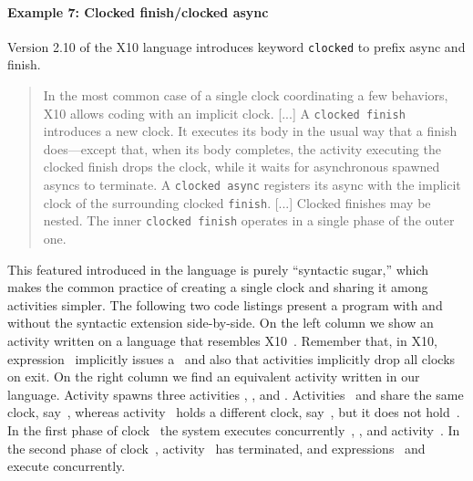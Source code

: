 \paragraph{Example 7: Clocked finish/clocked async}

Version 2.10 of the X10 language introduces keyword \lstinline{clocked} to
prefix async and finish.
\begin{quote}
  In the most common case of a single clock coordinating a few
  behaviors, X10 allows coding with an implicit clock.
[...]
A \lstinline{clocked finish} introduces a new clock.
It executes its body in the usual way that a finish does---except
  that, when its body completes, the activity executing the clocked
  finish drops the clock, while it waits for asynchronous spawned
  asyncs to terminate.
A \lstinline{clocked async} registers its async with the implicit clock
  of the surrounding clocked \lstinline{finish}.
[...]
Clocked finishes may be nested. The inner
  \lstinline{clocked finish} operates in a single phase of the outer one.
\end{quote}

This featured introduced in the language is purely ``syntactic
sugar,'' which makes the common practice of creating a single clock and
sharing it among activities simpler.
The following two code listings present a program with and without the
syntactic extension side-by-side.
On the left column we show an activity written on a language that
resembles X10~\cite{saraswat:x10-report}. Remember that, in X10,
expression~ implicitly issues a~ and also that
activities implicitly drop all clocks on exit.
On the right column we find an equivalent activity written in our language.
Activity  spawns three activities , , and .
Activities~ and  share the same clock, say~,
whereas activity~ holds a different clock, say~, but
it does not hold~.
In the first phase of clock~ the system executes
concurrently~, , and activity~.
In the second phase of clock~, activity~ has
terminated, and expressions~ and  execute concurrently.

